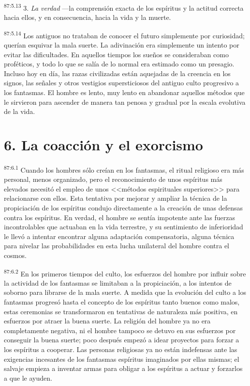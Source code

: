 \par
\textsuperscript{87:5.13} 3. \textit{La verdad} ---la comprensión exacta de los espíritus y la actitud correcta hacia ellos, y en consecuencia, hacia la vida y la muerte.

\par
\textsuperscript{87:5.14} Los antiguos no trataban de conocer el futuro simplemente por curiosidad; querían esquivar la mala suerte. La adivinación era simplemente un intento por evitar las dificultades. En aquellos tiempos los sueños se consideraban como proféticos, y todo lo que se salía de lo normal era estimado como un presagio. Incluso hoy en día, las razas civilizadas están aquejadas de la creencia en los signos, las señales y otros vestigios supersticiosos del antiguo culto progresivo a los fantasmas. El hombre es lento, muy lento en abandonar aquellos métodos que le sirvieron para ascender de manera tan penosa y gradual por la escala evolutiva de la vida.

\section*{6. La coacción y el exorcismo}
\par
\textsuperscript{87:6.1} Cuando los hombres sólo creían en los fantasmas, el ritual religioso era más personal, menos organizado, pero el reconocimiento de unos espíritus más elevados necesitó el empleo de unos <<métodos espirituales superiores>> para relacionarse con ellos. Esta tentativa por mejorar y ampliar la técnica de la propiciación de los espíritus condujo directamente a la creación de unas defensas contra los espíritus. En verdad, el hombre se sentía impotente ante las fuerzas incontrolables que actuaban en la vida terrestre, y su sentimiento de inferioridad le llevó a intentar encontrar alguna adaptación compensatoria, alguna técnica para nivelar las probabilidades en esta lucha unilateral del hombre contra el cosmos.

\par
\textsuperscript{87:6.2} En los primeros tiempos del culto, los esfuerzos del hombre por influir sobre la actividad de los fantasmas se limitaban a la propiciación, a los intentos de soborno para librarse de la mala suerte. A medida que la evolución del culto a los fantasmas progresó hasta el concepto de los espíritus tanto buenos como malos, estas ceremonias se transformaron en tentativas de naturaleza más positiva, en esfuerzos por atraer la buena suerte. La religión del hombre ya no era completamente negativa, ni el hombre tampoco se detuvo en sus esfuerzos por conseguir la buena suerte; poco después empezó a idear proyectos para forzar a los espíritus a cooperar. Las personas religiosas ya no están indefensas ante las exigencias incesantes de los fantasmas espíritus imaginados por ellas mismas; el salvaje empieza a inventar armas para obligar a los espíritus a actuar y forzarlos a que le ayuden.

